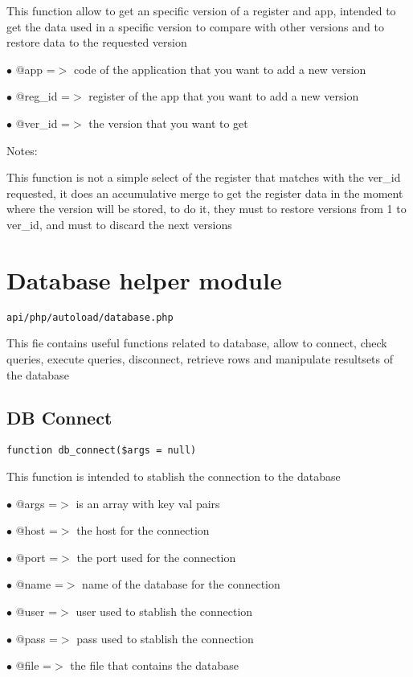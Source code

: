 \documentclass[a4paper]{book}
\begin{document}
This function allow to get an specific version of a register and app, intended
to get the data used in a specific version to compare with other versions and
to restore data to the requested version

\begin{compactitem}
\item[\color{myblue}$\bullet$] @app    =$>$ code of the application that you want to add a new version
\item[\color{myblue}$\bullet$] @reg\_id =$>$ register of the app that you want to add a new version
\item[\color{myblue}$\bullet$] @ver\_id =$>$ the version that you want to get
\end{compactitem}

Notes:

This function is not a simple select of the register that matches with the
ver\_id requested, it does an accumulative merge to get the register data
in the moment where the version will be stored, to do it, they must to
restore versions from 1 to ver\_id, and must to discard the next versions

\hypertarget{toc62}{}
\section{Database helper module}

\begin{lstlisting}
api/php/autoload/database.php
\end{lstlisting}

This fie contains useful functions related to database, allow to connect, check queries, execute
queries, disconnect, retrieve rows and manipulate resultsets of the database

\hypertarget{toc63}{}
\subsection{DB Connect}

\begin{lstlisting}
function db_connect($args = null)
\end{lstlisting}

This function is intended to stablish the connection to the database

\begin{compactitem}
\item[\color{myblue}$\bullet$] @args =$>$ is an array with key val pairs
\item[\color{myblue}$\bullet$] @host =$>$ the host for the connection
\item[\color{myblue}$\bullet$] @port =$>$ the port used for the connection
\item[\color{myblue}$\bullet$] @name =$>$ name of the database for the connection
\item[\color{myblue}$\bullet$] @user =$>$ user used to stablish the connection
\item[\color{myblue}$\bullet$] @pass =$>$ pass used to stablish the connection
\item[\color{myblue}$\bullet$] @file =$>$ the file that contains the database
\end{compactitem}
\end{document}
